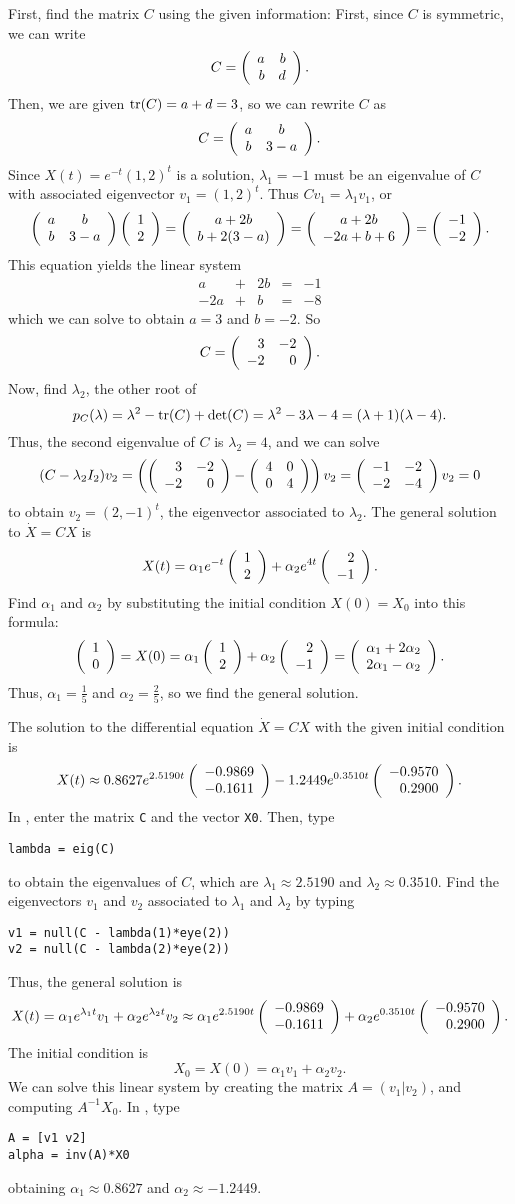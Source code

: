 \documentclass{ximera}
\begin{document}
\soln First, find the matrix $C$ using the given information:
First, since $C$ is symmetric, we can write
\[
C = \left(\begin{array}{rr} a & b\\ b &d\end{array}\right).
\]
Then, we are given ${\rm tr}(C) = a + d = 3$, so we can rewrite $C$ as
\[
C = \left(\begin{array}{cc} a & b\\ b &3 - a\end{array}\right).
\]
Since $X(t) = e^{-t}(1,2)^t$ is a solution, $\lambda_1 = -1$
must be an eigenvalue of $C$ with associated eigenvector $v_1 = (1,2)^t$.
Thus $Cv_1 = \lambda_1v_1$, or
\[
\left(\begin{array}{cc} a & b\\ b &3 - a\end{array}\right)\left(\begin{array}{r} 1 \\ 2\end{array}\right) = \left(\begin{array}{c} a + 2b \\ b + 2(3 - a)\end{array}\right)
= \left(\begin{array}{c} a + 2b \\ -2a + b + 6\end{array}\right) = \left(\begin{array}{r} -1 \\ -2\end{array}\right).
\]
This equation yields the linear system
\[
\begin{array}{rrrrr}
a & + & 2b & = & -1 \\
-2a & + & b & = & -8
\end{array}
\]
which we can solve to obtain $a = 3$ and $b = -2$.  So
\[
C = \left(\begin{array}{rr} 3 & -2\\ -2 &0\end{array}\right).
\]
Now, find $\lambda_2$, the other root of
\[
p_C(\lambda) = \lambda^2 - {\rm tr}(C) + \det(C) = \lambda^2 - 3\lambda -4
= (\lambda + 1)(\lambda - 4).
\]
Thus, the second eigenvalue of $C$ is $\lambda_2 = 4$, and we can solve
\[
(C - \lambda_2I_2)v_2 = \left(\left(\begin{array}{rr} 3 & -2\\ -2 &0\end{array}\right) - \left(\begin{array}{rr} 4 & 0\\ 0 &4\end{array}\right)
\right)v_2 = \left(\begin{array}{rr} -1 & -2\\ -2 &-4\end{array}\right)v_2 = 0
\]
to obtain $v_2 = (2,-1)^t$, the eigenvector associated to $\lambda_2$.
The general solution to $\dot{X} = CX$ is
\[
X(t) = \alpha_1e^{-t}\left(\begin{array}{r} 1 \\ 2\end{array}\right) + \alpha_2e^{4t}\left(\begin{array}{r} 2 \\ -1\end{array}\right).
\]
Find $\alpha_1$ and $\alpha_2$ by substituting the initial condition $X(0)
= X_0$ into this formula:
\[
\left(\begin{array}{r} 1 \\ 0\end{array}\right) = X(0) = \alpha_1\left(\begin{array}{r} 1 \\ 2\end{array}\right) + \alpha_2\left(\begin{array}{r} 2 \\ -1\end{array}\right)
= \left(\begin{array}{c} \alpha_1 + 2\alpha_2 \\ 2\alpha_1 - \alpha_2\end{array}\right).
\]
Thus, $\alpha_1 = \frac{1}{5}$ and $\alpha_2 = \frac{2}{5}$, so we find
the general solution.


 \ans The solution to the differential equation $\dot{X}
= CX$ with the given initial condition is
\[
X(t) \approx 0.8627e^{2.5190t}\left(\begin{array}{r} -0.9869 \\ -0.1611\end{array}\right)
- 1.2449e^{0.3510t}\left(\begin{array}{r} -0.9570 \\ 0.2900\end{array}\right).
\]
\soln In \Matlabp, enter the matrix {\tt C} and the vector {\tt X0}.  Then,
type
\begin{verbatim}
lambda = eig(C)
\end{verbatim}
to obtain the eigenvalues of $C$, which are
$\lambda_1 \approx 2.5190$ and $\lambda_2 \approx 0.3510$.  Find the
eigenvectors $v_1$ and $v_2$ associated to $\lambda_1$ and $\lambda_2$
by typing
\begin{verbatim}
v1 = null(C - lambda(1)*eye(2))
v2 = null(C - lambda(2)*eye(2))
\end{verbatim}
Thus, the general solution is
\[
X(t) = \alpha_1e^{\lambda_1 t}v_1 + \alpha_2e^{\lambda_2 t}v_2
\approx \alpha_1e^{2.5190t}\left(\begin{array}{r} -0.9869 \\ -0.1611\end{array}\right) +
\alpha_2e^{0.3510t}\left(\begin{array}{r} -0.9570 \\ 0.2900\end{array}\right).
\]
The initial condition is
\[
X_0 = X(0) = \alpha_1v_1 + \alpha_2v_2.
\]
We can solve this linear system by creating the matrix $A = (v_1|v_2)$, and
computing $A^{-1}X_0$.  In \Matlabp, type
\begin{verbatim}
A = [v1 v2]
alpha = inv(A)*X0
\end{verbatim}
obtaining $\alpha_1 \approx 0.8627$ and $\alpha_2 \approx -1.2449$.
\end{document}
